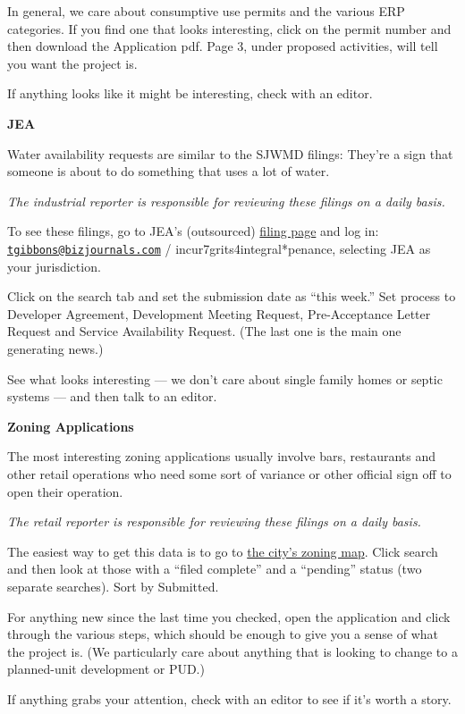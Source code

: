 \documentclass[
  11pt,
  american,
  letterpaperpaper,
  extrafontsizes,onecolumn,openright
  ]{memoir}
\begin{document}
In general, we care about consumptive use permits and the various ERP categories. If you find one that looks interesting, click on the permit number and then download the Application pdf. Page 3, under proposed activities, will tell you want the project is.

If anything looks like it might be interesting, check with an editor.

\textbf{JEA}

Water availability requests are similar to the SJWMD filings: They're a sign that someone is about to do something that uses a lot of water.

\emph{The industrial reporter is responsible for reviewing these filings on a daily basis.}

To see these filings, go to JEA's (outsourced) \href{https://www.sagesgov.com/Home/Search.aspx}{filing page} and log in: \href{mailto:tgibbons@bizjournals.com}{\nolinkurl{tgibbons@bizjournals.com}} / incur7grits4integral*penance, selecting JEA as your jurisdiction.

Click on the search tab and set the submission date as \enquote{this week.} Set process to Developer Agreement, Development Meeting Request, Pre-Acceptance Letter Request and Service Availability Request. (The last one is the main one generating news.)

See what looks interesting --- we don't care about single family homes or septic systems --- and then talk to an editor.

\textbf{Zoning Applications}

The most interesting zoning applications usually involve bars, restaurants and other retail operations who need some sort of variance or other official sign off to open their operation.

\emph{The retail reporter is responsible for reviewing these filings on a daily basis.}

The easiest way to get this data is to go to \href{https://maps.coj.net/luzap/SearchZoningPublic.aspx}{the city's zoning map}. Click search and then look at those with a \enquote{filed complete} and a \enquote{pending} status (two separate searches). Sort by Submitted.

For anything new since the last time you checked, open the application and click through the various steps, which should be enough to give you a sense of what the project is. (We particularly care about anything that is looking to change to a planned-unit development or PUD.)

If anything grabs your attention, check with an editor to see if it's worth a story.
\end{document}
